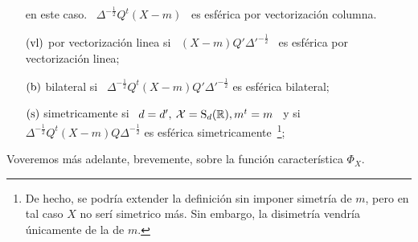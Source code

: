 \begin{definicion}
\begin{itemize}
{      en este caso.  \label{Foot:MP:EDvc}}  \ $\Delta^{-\frac12} Q^t (X-m)$ \ es
    esf\'erica por vectorizaci\'on columna.
  \item[$(\mathrm{vl})$] por vectorizaci\'on linea  si \ $(X-m) Q' \Delta'^{-\frac12}$
    \ es esf\'erica por vectorizaci\'on linea;
  \item[$(\mathrm{b})$]   bilateral    si   \   $\Delta^{-\frac12}    Q^t   (X-m)   Q'
    \Delta'^{-\frac12}$ es esf\'erica bilateral;
  \item[$(\mathrm{s})$] simetricamente si \ $d = d', \: \mathcal{X} = \mathrm{S}_d(\mathbb{R}), m^t = m$
    \ y si  \ \ $\Delta^{-\frac12} Q^t (X-m)  Q \Delta^{-\frac12}$ es esf\'erica
    simetricamente~\footnote{De hecho, se  podr\'ia extender la definici\'on sin
      imponer  simetr\'ia de  $m$,  pero en  tal  caso $X$  no ser\'i  simetrico
      m\'as. Sin embargo, la disimetr\'ia vendr\'ia \'unicamente de la de $m$.};
  \end{itemize}
\end{definicion}

Voveremos  m\'as  adelante,  brevemente,  sobre  la  funci\'on  caracter\'istica
$\Phi_X$.

